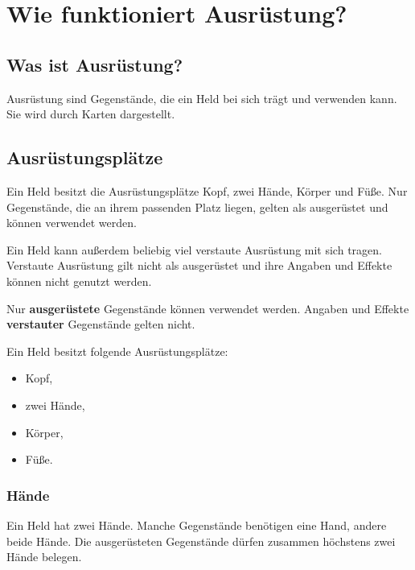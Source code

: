 \chapter{Wie funktioniert Ausrüstung?}
\label{chap:equipment}

\section{Was ist Ausrüstung?}

Ausrüstung sind Gegenstände, die ein Held bei sich trägt und verwenden kann. Sie wird durch Karten dargestellt.

\section{Ausrüstungsplätze}

Ein Held besitzt die Ausrüstungsplätze Kopf, zwei Hände, Körper und Füße. Nur Gegenstände, die an ihrem passenden Platz liegen, gelten als ausgerüstet und können verwendet werden.

Ein Held kann außerdem beliebig viel verstaute Ausrüstung mit sich tragen. Verstaute Ausrüstung gilt nicht als ausgerüstet und ihre Angaben und Effekte können nicht genutzt werden.

\begin{kurzregel}[title=Ausgerüstet und verstaut]
Nur \textbf{ausgerüstete} Gegenstände können verwendet werden. Angaben und Effekte \textbf{verstauter} Gegenstände gelten nicht.
\end{kurzregel}

\begin{kurzregel}[title=Ausrüstungsplätze]
Ein Held besitzt folgende Ausrüstungsplätze:

\begin{itemize}
  \item Kopf,
  \item zwei Hände,
  \item Körper,
  \item Füße.
\end{itemize}
\end{kurzregel}

\subsection{Hände}

Ein Held hat zwei Hände. Manche Gegenstände benötigen eine Hand, andere beide Hände. Die ausgerüsteten Gegenstände dürfen zusammen höchstens zwei Hände belegen.


